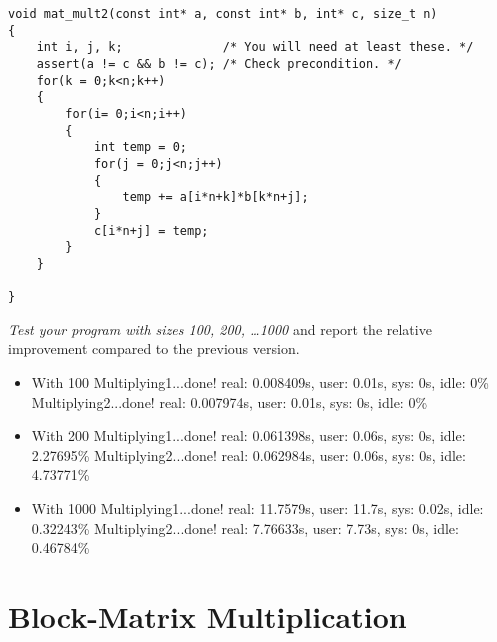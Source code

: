 \documentclass{article}
\begin{document}
\begin{ExerciseList}
\begin{lstlisting}
void mat_mult2(const int* a, const int* b, int* c, size_t n)
{
    int i, j, k;              /* You will need at least these. */
    assert(a != c && b != c); /* Check precondition. */
	for(k = 0;k<n;k++)
	{
		for(i= 0;i<n;i++)
		{
			int temp = 0;
			for(j = 0;j<n;j++)
			{
				temp += a[i*n+k]*b[k*n+j];
			}
			c[i*n+j] = temp;
		}
	}
	
}
\end{lstlisting}

\Question
\emph{Test your program with sizes 100, 200, \dots 1000} and report
the relative improvement compared to the previous version.
\Answer 
\begin{itemize}
\item With 100
\subitem Multiplying1...done!	real: 0.008409s, user: 0.01s, sys: 0s, idle: 0\%
\subitem Multiplying2...done!	real: 0.007974s, user: 0.01s, sys: 0s, idle: 0\%
\item With 200
\subitem Multiplying1...done!	real: 0.061398s, user: 0.06s, sys: 0s, idle: 2.27695\%
\subitem Multiplying2...done!	real: 0.062984s, user: 0.06s, sys: 0s, idle: 4.73771\%
\item With 1000
\subitem Multiplying1...done!	real: 11.7579s, user: 11.7s, sys: 0.02s, idle: 0.32243\%
\subitem Multiplying2...done!	real: 7.76633s, user: 7.73s, sys: 0s, idle: 0.46784\%
\end{itemize}

\end{ExerciseList}

\section{Block-Matrix Multiplication}
\end{document}
